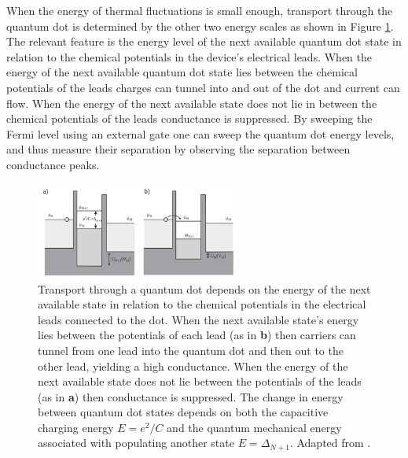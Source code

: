 \documentclass[edeposit,fullpage,draftthesis]{uiucthesis2009}
\begin{document}
        When the energy of thermal fluctuations is small enough,
        transport through the quantum dot is determined by the other two energy scales as shown in 
        Figure \ref{fig:cb_energies}. The relevant feature is the energy level of the next available quantum dot
        state in relation to the chemical potentials in the device's electrical leads.
        When the energy of the next available quantum dot state lies between
        the chemical potentials of the leads charges can tunnel into and out of the dot and
        current can flow.
        When the energy of the next available state does not lie in between the chemical potentials of the leads
        conductance is suppressed. 
        By sweeping the Fermi level using an external gate one can sweep the quantum dot energy levels,
        and thus measure their separation by observing the separation between conductance peaks.
        
        
            \begin{figure}
            \centering
            \includegraphics[width=0.6\textwidth]{images/background/cb_energies.png}
            \caption[Coulomb blockade energy levels]{
            Transport through a quantum dot depends on the energy of the next available state in
            relation to the chemical potentials in the electrical leads connected to the dot.
            When the next available state's energy lies between the potentials of each lead (as in \textbf{b})
            then carriers can tunnel from one lead into the quantum dot and then out to the other lead,
            yielding a high conductance. When the energy of the next available state does not lie between
            the potentials of the leads (as in \textbf{a}) then conductance is suppressed. The change
            in energy between quantum dot states depends on both the capacitive charging energy $E = e^2 / C$
            and the quantum mechanical energy associated with populating another state $E = \Delta_{N+1}$.
            Adapted from \cite{cb_lecture07}.
            }
            \label{fig:cb_energies}
            \end{figure}
 
\end{document}

